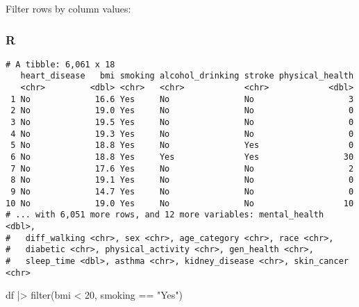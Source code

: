 \documentclass[
  letterpaper,
  DIV=11,
  numbers=noendperiod]{scrreprt}
\newenvironment{Shaded}{\begin{snugshade}}{\end{snugshade}}
\newcommand{\DecValTok}[1]{\textcolor[rgb]{0.68,0.00,0.00}{#1}}
\newcommand{\FunctionTok}[1]{\textcolor[rgb]{0.28,0.35,0.67}{#1}}
\newcommand{\NormalTok}[1]{\textcolor[rgb]{0.00,0.46,0.62}{#1}}
\newcommand{\SpecialCharTok}[1]{\textcolor[rgb]{0.37,0.37,0.37}{#1}}
\newcommand{\StringTok}[1]{\textcolor[rgb]{0.13,0.47,0.30}{#1}}
\begin{document}
Filter rows by column values:

\hypertarget{r-16}{%
\subsubsection{R}\label{r-16}}

\begin{Shaded}
\end{Shaded}

\begin{verbatim}
# A tibble: 6,061 x 18
   heart_disease   bmi smoking alcohol_drinking stroke physical_health
   <chr>         <dbl> <chr>   <chr>            <chr>            <dbl>
 1 No             16.6 Yes     No               No                   3
 2 No             19.0 Yes     No               No                   0
 3 No             19.5 Yes     No               No                   0
 4 No             19.3 Yes     No               No                   0
 5 No             18.8 Yes     No               Yes                  0
 6 No             18.8 Yes     Yes              Yes                 30
 7 No             17.6 Yes     No               No                   2
 8 No             19.1 Yes     No               No                   0
 9 No             14.7 Yes     No               No                   0
10 No             19.0 Yes     No               No                  10
# ... with 6,051 more rows, and 12 more variables: mental_health <dbl>,
#   diff_walking <chr>, sex <chr>, age_category <chr>, race <chr>,
#   diabetic <chr>, physical_activity <chr>, gen_health <chr>,
#   sleep_time <dbl>, asthma <chr>, kidney_disease <chr>, skin_cancer <chr>
\end{verbatim}

\begin{Shaded}
\begin{Highlighting}[]
\NormalTok{df }\SpecialCharTok{|\textgreater{}} \FunctionTok{filter}\NormalTok{(bmi }\SpecialCharTok{\textless{}} \DecValTok{20}\NormalTok{, smoking }\SpecialCharTok{==} \StringTok{"Yes"}\NormalTok{)}
\end{Highlighting}
\end{Shaded}
\end{document}
